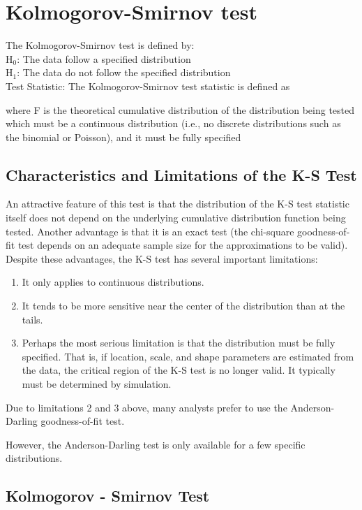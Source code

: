 \documentclass[a4paper,12pt]{article}
\begin{document}
\section{Kolmogorov-Smirnov test}
 The Kolmogorov-Smirnov test is defined by:
\\
H$_0$:     The data follow a specified distribution\\
H$_1$:     The data do not follow the specified distribution\\

Test Statistic:     The Kolmogorov-Smirnov test statistic is defined as

where F is the theoretical cumulative distribution of the distribution being tested which must be a continuous distribution (i.e., no discrete distributions such as the binomial or Poisson), and it must be fully specified

\subsection{ Characteristics and Limitations of the K-S Test}


An attractive feature of this test is that the distribution of the K-S test statistic itself does not depend on the underlying cumulative distribution function being tested. Another advantage is that it is an exact test (the chi-square goodness-of-fit test depends on an adequate sample size for the approximations to be valid). Despite these advantages, the K-S test has several important limitations:
\begin{enumerate}
\item It only applies to continuous distributions.
\item It tends to be more sensitive near the center of the distribution than at the tails.
\item Perhaps the most serious limitation is that the distribution must be fully specified. That is, if location, scale, and shape parameters are estimated from the data, the critical region of the K-S test is no longer valid. It typically must be determined by simulation.
\end{enumerate}
Due to limitations 2 and 3 above, many analysts prefer to use the Anderson-Darling goodness-of-fit test.

However, the Anderson-Darling test is only available for a few specific distributions.

\subsection{Kolmogorov - Smirnov Test}
\end{document}
